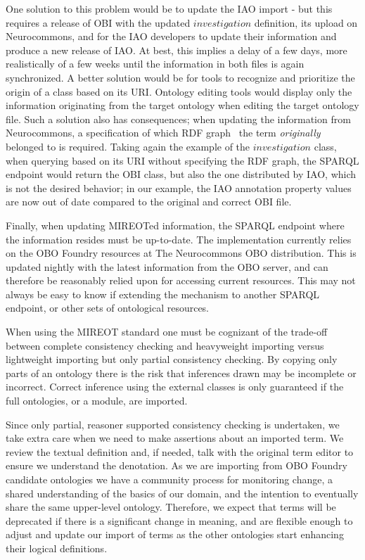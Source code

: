 \documentclass{ao2e}%
\begin{document}
One solution to this problem would be to update the \ac{IAO} import - but this requires a release of \ac{OBI} with the updated $investigation$ definition, its upload on Neurocommons, and for the \ac{IAO} developers to update their information and produce a new release of \ac{IAO}. At best, this implies a delay of a few days, more realistically of a few weeks until the information in both files is again synchronized.
A better solution would be for tools to recognize and prioritize the origin of a class based on its URI. Ontology editing tools would display only the information originating from the target ontology when editing the target ontology file.
Such a solution also has consequences; when updating the information from Neurocommons, a specification of which \ac{RDF} graph~\cite{RDF} the term \emph{originally} belonged to is required. Taking again the example of the $investigation$ class, when querying based on its URI without specifying the RDF graph, the SPARQL endpoint would return the \ac{OBI} class, but also the one distributed by \ac{IAO}, which is not the desired behavior; in our example, the \ac{IAO} annotation property values are now out of date compared to the original and correct \ac{OBI} file.

Finally, when updating MIREOTed information, the SPARQL endpoint where the information resides must be up-to-date. The implementation currently relies on the \ac{OBO} Foundry resources at The Neurocommons \ac{OBO} distribution. This is updated nightly with the latest information from the \ac{OBO} server, and can therefore be reasonably relied upon for accessing current resources. This may not always be easy to know if extending the mechanism to another SPARQL endpoint, or other sets of ontological resources.

When using the \ac{MIREOT} standard one must be cognizant of the trade-off between complete consistency checking and heavyweight importing versus lightweight importing but only partial consistency checking.
By copying only parts of an ontology there is the risk that inferences drawn may be incomplete or incorrect. 
Correct inference using the external classes is only guaranteed if the full ontologies, or a module, are imported.

Since only partial, reasoner supported consistency checking is undertaken, we take extra care when we need to make assertions about an imported term. %
We review the textual definition and, if needed, talk with the original term editor to ensure we understand the denotation.
As we are importing from \ac{OBO} Foundry candidate ontologies we have a community process for monitoring change, a shared understanding of the basics of our domain, and the intention to eventually share the same upper-level ontology. 
Therefore, we expect that terms will be deprecated if there is a significant change in meaning, and are flexible enough to adjust and update our import of terms as the other ontologies start enhancing their logical definitions.
\end{document}
